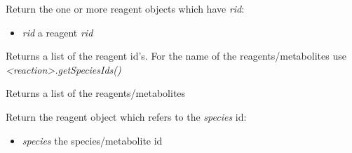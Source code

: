 \documentclass[a4paper,11pt,english]{sphinxmanual}
\begin{document}
\begin{fulllineitems}
\begin{fulllineitems}
\begin{itemize}
\end{itemize}

\end{fulllineitems}


\begin{fulllineitems}
\label{modules_doc:cbmpy.CBModel.Reaction.getReagent}
Return the one or more reagent objects which have \emph{rid}:
\begin{itemize}
\item {} 
\emph{rid} a reagent \emph{rid}

\end{itemize}

\end{fulllineitems}


\begin{fulllineitems}
\label{modules_doc:cbmpy.CBModel.Reaction.getReagentObjIds}
Returns a list of the reagent id's. For the name of the reagents/metabolites use \emph{\textless{}reaction\textgreater{}.getSpeciesIds()}

\end{fulllineitems}


\begin{fulllineitems}
\label{modules_doc:cbmpy.CBModel.Reaction.getReagentRefs}
Returns a list of the reagents/metabolites

\end{fulllineitems}


\begin{fulllineitems}
\label{modules_doc:cbmpy.CBModel.Reaction.getReagentWithSpeciesRef}
Return the reagent object which refers to the \emph{species} id:
\begin{itemize}
\item {} 
\emph{species} the species/metabolite id

\end{itemize}


\end{fulllineitems}
\end{fulllineitems}
\end{document}
